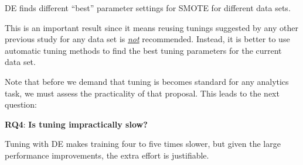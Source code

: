 \documentclass[sigconf,review, anonymous]{acmart}
\theoremstyle{break}
\theoremstyle{break}
\begin{document}
 \begin{lesson}DE finds different ``best'' parameter settings for SMOTE for different data sets.
 \end{lesson}
  This is an important result
  since it means
  reusing tunings  suggested  by  any other  previous study  for any data set is \underline{{\em not}} recommended. Instead,  it is better to
      use automatic tuning  methods  to find the best tuning parameters for the 
      current data set.
      
       Note that
 before we demand that tuning is becomes
 standard for any analytics task,
 we must assess the practicality of that
 proposal. This leads to the next question:
 
   \textbf{RQ4}: \textbf{Is tuning 
   impractically
   slow?} 
 
 \begin{lesson}Tuning with DE makes training four to five times slower, but given
 the large performance improvements,
 the extra effort is justifiable. \end{lesson}
 
 
 
\end{document}
